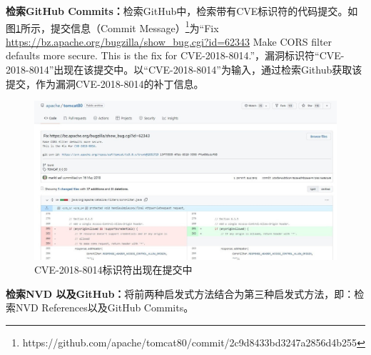 \textbf{检索GitHub Commits：}检索GitHub中，检索带有CVE标识符的代码提交\cite{you2017semfuzz,Wang2020empirical}。如图\ref{fig:commitmessage}所示，提交信息（Commit Message）\footnote{https://github.com/apache/tomcat80/commit/2c9d8433bd3247a2856d4b255}为“Fix \url{https://bz.apache.org/bugzilla/show_bug.cgi?id=62343} Make CORS filter defaults more secure. This is the fix for CVE-2018-8014.”，漏洞标识符“CVE-2018-8014”出现在该提交中。以“CVE-2018-8014”为输入，通过检索Github获取该提交，作为漏洞CVE-2018-8014的补丁信息。
\begin{figure}[h]
    \centering
    \includegraphics[scale=0.45]{res/CVE in commit message.jpg}
    \caption{CVE-2018-8014标识符出现在提交中}\label{fig:commitmessage}
\end{figure}

\textbf{检索NVD 以及GitHub：}将前两种启发式方法结合为第三种启发式方法，即：检索NVD References以及GitHub Commits。

